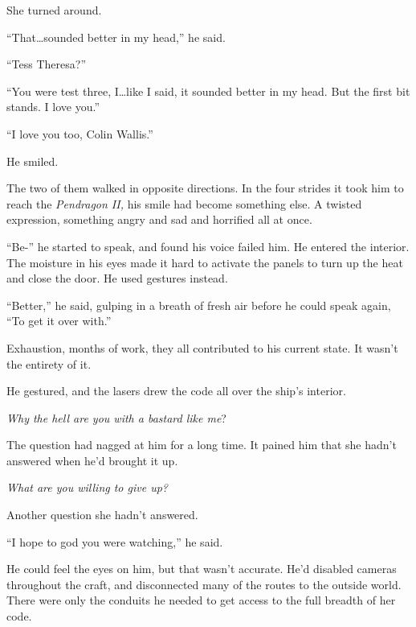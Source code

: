 She turned around.



``That\ldots sounded better in my head,'' he said.



``Tess Theresa?''



``You were test three, I\ldots like I said, it sounded better in my head.  But the first bit stands.  I love you.''



``I love you too, Colin Wallis.''



He smiled.



The two of them walked in opposite directions.  In the four strides it took him to reach the \emph{Pendragon II, }his smile had become something else.  A twisted expression, something angry and sad and horrified all at once.



``Be-'' he started to speak, and found his voice failed him.  He entered the interior.  The moisture in his eyes made it hard to activate the panels to turn up the heat and close the door.  He used gestures instead.



``Better,'' he said, gulping in a breath of fresh air before he could speak again, ``To get it over with.''



Exhaustion, months of work, they all contributed to his current state.  It wasn't the entirety of it.



He gestured, and the lasers drew the code all over the ship's interior.



\emph{Why the hell are you with a bastard like me}?



The question had nagged at him for a long time.  It pained him that she hadn't answered when he'd brought it up.



\emph{What are you willing to give up?}



Another question she hadn't answered.



``I hope to god you were watching,'' he said.



He could feel the eyes on him, but that wasn't accurate.  He'd disabled cameras throughout the craft, and disconnected many of the routes to the outside world.  There were only the conduits he needed to get access to the full breadth of her code.



